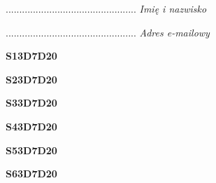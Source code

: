 \begin{turn}{90}\begin{minipage}{\linewidth} \vspace{20mm} ................................................  \textit{Imię i nazwisko}\end{minipage}\end{turn}

\begin{turn}{90}\begin{minipage}{\linewidth} \vspace{20mm} ................................................  \textit{Adres e-mailowy}\end{minipage}\end{turn}

\begin{turn}{90}\huge \begin{minipage}{\linewidth} \vspace{10mm}\textbf{S13D7D20}\end{minipage}\end{turn}

\begin{turn}{90}\huge \begin{minipage}{\linewidth} \vspace{10mm}\textbf{S23D7D20}\end{minipage}\end{turn}

\begin{turn}{90}\huge \begin{minipage}{\linewidth} \vspace{10mm}\textbf{S33D7D20}\end{minipage}\end{turn}

\begin{turn}{90}\huge \begin{minipage}{\linewidth} \vspace{10mm}\textbf{S43D7D20}\end{minipage}\end{turn}

\begin{turn}{90}\huge \begin{minipage}{\linewidth} \vspace{10mm}\textbf{S53D7D20}\end{minipage}\end{turn}

\begin{turn}{90}\huge \begin{minipage}{\linewidth} \vspace{10mm}\textbf{S63D7D20}\end{minipage}\end{turn}

